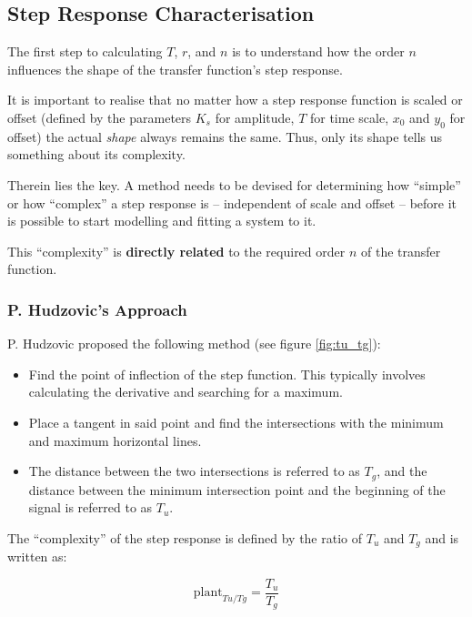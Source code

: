 \subsection{Step Response Characterisation}

The first step to calculating $T$, $r$, and $n$ is to  understand  how the order
$n$ influences the shape of the transfer function's step response.

It is important to realise that no matter how a step response function is scaled
or  offset  (defined  by the parameters $K_s$ for amplitude, $T$ for time scale,
$x_0$ and $y_0$ for offset) the actual \textit{shape}  always  remains the same.
Thus, only its shape tells us something about its complexity.

Therein  lies  the  key. A method  needs  to  be  devised  for  determining  how
``simple''  or  how ``complex'' a step response is -- independent of  scale  and
offset -- before  it  is possible to start modelling and fitting a system to it.

This ``complexity'' is \textbf{directly related}  to  the  required order $n$ of
the transfer function.


\subsubsection*{P. Hudzovic's Approach}

P. Hudzovic proposed the following method (see figure \ref{fig:tu_tg}):

\begin{itemize}
    \item
Find  the  point  of  inflection of the step function. This  typically  involves
calculating the derivative and searching for a maximum.
    \item
Place a tangent  in  said  point and find the intersections with the minimum and
maximum horizontal lines.
    \item
The distance between the two intersections  is  referred  to  as  $T_g$, and the
distance between  the minimum intersection point and the beginning of the signal
is referred to as $T_u$.
\end{itemize}

The ``complexity'' of the  step  response  is  defined by the ratio of $T_u$ and
$T_g$ and is written as:

\begin{equation}
    \textrm{plant}_{Tu/Tg} = \frac{T_u}{T_g}
    \label{eq:tu_tg}
\end{equation}



